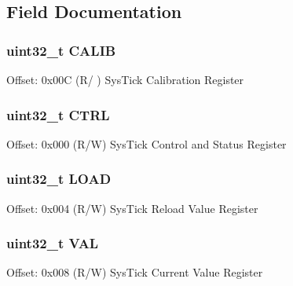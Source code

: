 \subsection{Field Documentation}
\hypertarget{struct_sys_tick___type_a40e07d0a4638a676780713b6ceeec4ef}{
\subsubsection[{C\-A\-L\-I\-B}]{ uint32\-\_\-t C\-A\-L\-I\-B}}\label{struct_sys_tick___type_a40e07d0a4638a676780713b6ceeec4ef}
Offset\-: 0x00\-C (R/ ) Sys\-Tick Calibration Register \hypertarget{struct_sys_tick___type_a15fc8d35f045f329b80c544bef35ff64}{
\subsubsection[{C\-T\-R\-L}]{ uint32\-\_\-t C\-T\-R\-L}}\label{struct_sys_tick___type_a15fc8d35f045f329b80c544bef35ff64}
Offset\-: 0x000 (R/\-W) Sys\-Tick Control and Status Register \hypertarget{struct_sys_tick___type_aad9adf4efc940cddb8161b69cfbe19d3}{
\subsubsection[{L\-O\-A\-D}]{ uint32\-\_\-t L\-O\-A\-D}}\label{struct_sys_tick___type_aad9adf4efc940cddb8161b69cfbe19d3}
Offset\-: 0x004 (R/\-W) Sys\-Tick Reload Value Register \hypertarget{struct_sys_tick___type_a26fb318c3b0a0ec7f45daafd5f8799a3}{
\subsubsection[{V\-A\-L}]{ uint32\-\_\-t V\-A\-L}}\label{struct_sys_tick___type_a26fb318c3b0a0ec7f45daafd5f8799a3}
Offset\-: 0x008 (R/\-W) Sys\-Tick Current Value Register 

